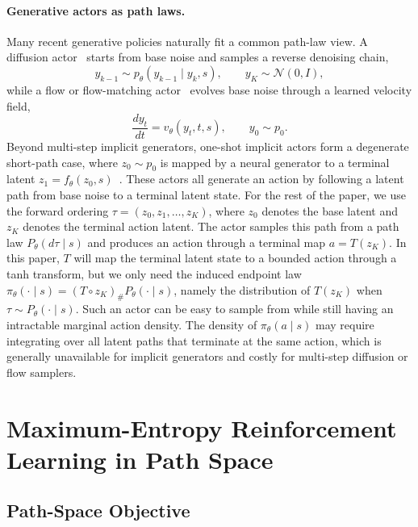 \documentclass[11pt]{article}
\begin{document}
\paragraph{Generative actors as path laws.}
Many recent generative policies naturally fit a common path-law view. A diffusion actor~\cite{Diffusion20,DDiffPG24,DIME25} starts from base noise and samples a reverse denoising chain,
\begin{equation}
  y_{k-1}\sim p_\theta(y_{k-1}\mid y_k,s),
  \qquad
  y_K\sim\mathcal N(0,I),
\end{equation}
while a flow or flow-matching actor~\cite{FlowMatching22,FPO25,ReinFlow25} evolves base noise through a learned velocity field,
\begin{equation}
  \frac{d y_t}{d t}=v_\theta(y_t,t,s),
  \qquad
  y_0\sim p_0.
\end{equation}
Beyond multi-step implicit generators, one-shot implicit actors form a degenerate short-path case, where $z_0\sim p_0$ is mapped by a neural generator to a terminal latent $z_1=f_\theta(z_0,s)$~\cite{WPPG26}. These actors all generate an action by following a latent path from base noise to a terminal latent state. For the rest of the paper, we use the forward ordering $\tau=(z_0,z_1,\ldots,z_K)$, where $z_0$ denotes the base latent and $z_K$ denotes the terminal action latent. The actor samples this path from a path law $P_\theta(d\tau\mid s)$ and produces an action through a terminal map $a=T(z_K)$. In this paper, $T$ will map the terminal latent state to a bounded action through a tanh transform, but we only need the induced endpoint law $\pi_\theta(\cdot\mid s) = (T\circ z_K)_{\#}P_\theta(\cdot\mid s)$, namely the distribution of $T(z_K)$ when $\tau\sim P_\theta(\cdot\mid s)$. Such an actor can be easy to sample from while still having an intractable marginal action density. The density of $\pi_\theta(a\mid s)$ may require integrating over all latent paths that terminate at the same action, which is generally unavailable for implicit generators and costly for multi-step diffusion or flow samplers.

\section{Maximum-Entropy Reinforcement Learning in Path Space}

\subsection{Path-Space Objective}
\end{document}
